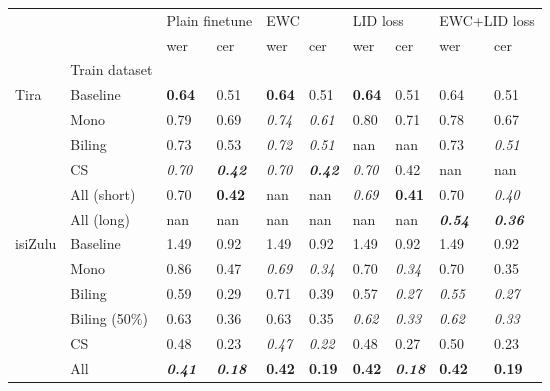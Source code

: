 \begin{tabular}{llllllllll}
\toprule
 &  & \multicolumn{2}{l}{Plain finetune} & \multicolumn{2}{l}{EWC} & \multicolumn{2}{l}{LID loss} & \multicolumn{2}{l}{EWC+LID loss} \\
 &  & wer & cer & wer & cer & wer & cer & wer & cer \\
 & Train dataset &  &  &  &  &  &  &  &  \\
\midrule
Tira & Baseline & \textbf{0.64} & 0.51 & \textbf{0.64} & 0.51 & \textbf{0.64} & 0.51 & 0.64 & 0.51 \\
 & Mono & 0.79 & 0.69 & \textit{0.74} & \textit{0.61} & 0.80 & 0.71 & 0.78 & 0.67 \\
 & Biling & 0.73 & 0.53 & \textit{0.72} & \textit{0.51} & nan & nan & 0.73 & \textit{0.51} \\
 & CS & \textit{0.70} & \textit{\textbf{0.42}} & \textit{0.70} & \textit{\textbf{0.42}} & \textit{0.70} & 0.42 & nan & nan \\
 & All (short) & 0.70 & \textbf{0.42} & nan & nan & \textit{0.69} & \textbf{0.41} & 0.70 & \textit{0.40} \\
 & All (long) & nan & nan & nan & nan & nan & nan & \textit{\textbf{0.54}} & \textit{\textbf{0.36}} \\
\midrule
isiZulu & Baseline & 1.49 & 0.92 & 1.49 & 0.92 & 1.49 & 0.92 & 1.49 & 0.92 \\
 & Mono & 0.86 & 0.47 & \textit{0.69} & \textit{0.34} & 0.70 & \textit{0.34} & 0.70 & 0.35 \\
 & Biling & 0.59 & 0.29 & 0.71 & 0.39 & 0.57 & \textit{0.27} & \textit{0.55} & \textit{0.27} \\
 & Biling (50\%) & 0.63 & 0.36 & 0.63 & 0.35 & \textit{0.62} & \textit{0.33} & \textit{0.62} & \textit{0.33} \\
 & CS & 0.48 & 0.23 & \textit{0.47} & \textit{0.22} & 0.48 & 0.27 & 0.50 & 0.23 \\
 & All & \textit{\textbf{0.41}} & \textit{\textbf{0.18}} & \textbf{0.42} & \textbf{0.19} & \textbf{0.42} & \textit{\textbf{0.18}} & \textbf{0.42} & \textbf{0.19} \\
\bottomrule
\end{tabular}
